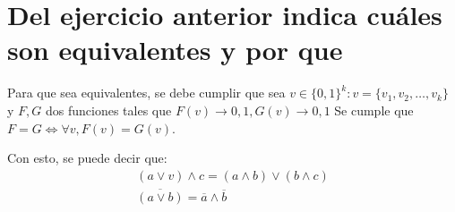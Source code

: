 \section{Del ejercicio anterior indica cuáles son equivalentes y por que}
Para que sea equivalentes, se debe cumplir que sea 
$v \in \{0,1\} ^ k: v = \{v_1, v_2, \dots, v_k\}$ y $F, G$ dos funciones tales que $F(v) \rightarrow {0,1}, G(v) \rightarrow {0,1}$
Se cumple que $F = G \iff \forall v, F(v) = G(v)$.

Con esto, se puede decir que:
\begin{gather*}
    (a\vee v)\wedge c = (a\wedge b) \vee (b \wedge c) \\
    \overline{(a\vee b)} = \overline{a} \wedge \overline{b}
\end{gather*}